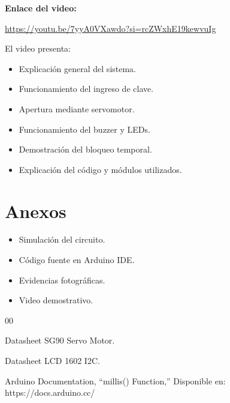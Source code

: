 \documentclass[conference]{IEEEtran}
\begin{document}
\vspace{0.3cm}

\noindent
\textbf{Enlace del video:}

\url{https://youtu.be/7yyA0VXawdo?si=rcZWxhE19kewvuIg}

\vspace{0.3cm}

\noindent
El video presenta:

\begin{itemize}
    \item Explicación general del sistema.
    \item Funcionamiento del ingreso de clave.
    \item Apertura mediante servomotor.
    \item Funcionamiento del buzzer y LEDs.
    \item Demostración del bloqueo temporal.
    \item Explicación del código y módulos utilizados.
\end{itemize}

\section*{Anexos}

\begin{itemize}
    \item Simulación del circuito.
    \item Código fuente en Arduino IDE.
    \item Evidencias fotográficas.
    \item Video demostrativo.
\end{itemize}

\begin{thebibliography}{00}

 Datasheet SG90 Servo Motor.

 Datasheet LCD 1602 I2C.

 Arduino Documentation, ``millis() Function,'' Disponible en: https://docs.arduino.cc/

\end{thebibliography}
\end{document}
